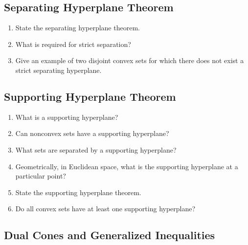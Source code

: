 \documentclass[]{article}
\newcounter{q}
\begin{document}
\subsection*{Separating Hyperplane Theorem}

\begin{enumerate}[resume*]
\item State the separating hyperplane theorem.
\item What is required for strict separation?
\item Give an example of two disjoint convex sets for which there does not exist a strict separating hyperplane.
\end{enumerate}

\subsection*{Supporting Hyperplane Theorem}

\begin{enumerate}[resume*]
\item What is a supporting hyperplane?
\item Can nonconvex sets have a supporting hyperplane?
\item What sets are separated by a supporting hyperplane?
\item Geometrically, in Euclidean space, what is the supporting hyperplane at a particular point?
\item State the supporting hyperplane theorem.
\item Do all convex sets have at least one supporting hyperplane?
\end{enumerate}

\subsection*{Dual Cones and Generalized Inequalities}
\end{document}
